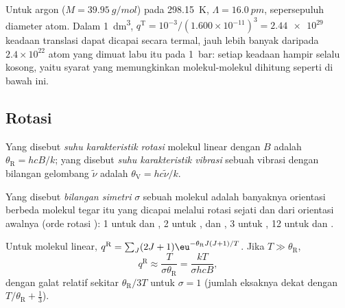 \begin{example}\label{ex:b3:partition-functions:argon}
Untuk argon ($M = \qty{39.95}{g/mol}$) pada \qty{298.15}{K}, $\Lambda = \qty{16.0}{pm}$,
sepersepuluh diameter atom. Dalam \qty{1}{dm^3},
$q^{\mathrm T} = 10^{-3}/(1.600\times10^{-11})^3 = \num{2.44e29}$ keadaan translasi
dapat dicapai secara termal, jauh lebih banyak daripada $2.4\times10^{22}$ atom
yang dimuat labu itu pada \qty{1}{bar}: setiap keadaan hampir selalu kosong,
yaitu syarat yang memungkinkan molekul-molekul dihitung seperti di bawah ini.
\end{example}

\subsection*{Rotasi}

\begin{definition}\label{def:b3:partition-functions:characteristic-temperature}
Yang disebut \emph{suhu karakteristik rotasi}
molekul linear dengan  $B$ adalah $\theta_{\mathrm R} =
hcB/k$; yang disebut \emph{suhu karakteristik
vibrasi} sebuah vibrasi dengan bilangan gelombang $\tilde\nu$
adalah $\theta_{\mathrm V} =
hc\tilde\nu/k$.
\end{definition}

\begin{definition}\label{def:b3:partition-functions:symmetry-number}
Yang disebut \emph{bilangan simetri} $\sigma$ sebuah
molekul adalah banyaknya orientasi berbeda molekul tegar itu yang dicapai
melalui rotasi sejati dan  dari orientasi awalnya (orde 
rotasi ): 1 untuk  dan , 2 untuk ,
 dan , 3 untuk , 12 untuk  dan .
\end{definition}

\begin{proposition}\label{prop:b3:partition-functions:q-rot}
Untuk molekul linear, $q^{\mathrm R} = \sum_J(2J+1)\eu^{-\theta_{\mathrm R}J(J+1)/T}$. Jika
$T \gg
\theta_{\mathrm R}$,
\[
  q^{\mathrm R} \approx \frac{T}{\sigma\theta_{\mathrm R}} = \frac{kT}{\sigma hcB},
\]
dengan galat relatif sekitar $\theta_{\mathrm R}/3T$ untuk $\sigma = 1$ (jumlah
eksaknya dekat dengan $T/\theta_{\mathrm R} + \frac13$).
\end{proposition}

